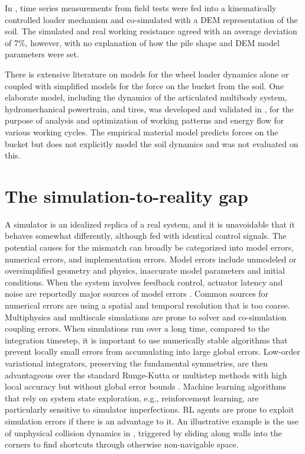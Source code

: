 \documentclass[10pt]{article}
\begin{document}
In \cite{Wang2022a}, time series measurements from field tests were fed into a kinematically controlled loader mechanism 
and co-simulated with a DEM representation of the soil. The simulated and real 
working resistance agreed with an average deviation of 7\%,
however, with no explanation of how the pile shape and DEM model parameters were set.

There is extensive literature on models for the wheel loader dynamics alone or coupled
with simplified models for the force on the bucket from the soil. One elaborate model, including the dynamics of
the articulated multibody system, hydromechanical powertrain, and tires, 
was developed and validated in \cite{Oh2015,Kim2016}, for the purpose of analysis and optimization 
of working patterns and energy flow for various working cycles. The empirical material model 
predicts forces on the bucket but does not explicitly model the soil dynamics and was not
evaluated on this. 

																												   
																								 
																						 

																				  
																							  
												 


\section{The simulation-to-reality gap}
\label{sec:sim2realGap}

A simulator is an idealized replica of a real system, and it is unavoidable that it
behaves somewhat differently, although fed with identical control signals. The potential causes
for the mismatch can broadly be categorized into model errors, numerical errors, and 
implementation errors.
Model errors include unmodeled or oversimplified geometry and physics, inaccurate model 
parameters and initial conditions. When the system involves 
feedback control, actuator latency and noise are reportedly major sources of model errors 
\cite{ibarz2021}.
Common sources for numerical errors are using a spatial and temporal resolution that is too coarse.
Multiphysics and multiscale simulations are prone to solver and co-simulation coupling errors. 
When simulations run over a long time, compared to the integration timestep, it is important
to use numerically stable algorithms that prevent locally small errors from accumulating
into large global errors. Low-order variational integrators, preserving the fundamental symmetries,
are then advantageous over the standard Runge-Kutta or multistep methods with high local accuracy but without
global error bounds \cite{hairer:1996:sod}.
Machine learning algorithms that rely on system state exploration, e.g., reinforcement learning, are particularly sensitive to 
simulator imperfections. RL agents are prone to exploit simulation errors 
if there is an advantage to it. An illustrative example is the use of unphysical collision dynamics in \cite{Kadian2020}, triggered by sliding along walls into the corners to find shortcuts through otherwise non-navigable space. 
\end{document}
